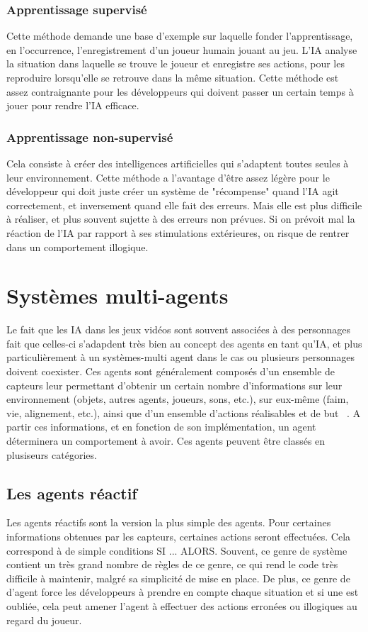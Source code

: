 \documentclass[asi]{picINSA}
\begin{document}
\subsection{Apprentissage supervisé}
Cette méthode demande une base d’exemple sur laquelle fonder l’apprentissage, en l’occurrence, l’enregistrement d’un joueur humain jouant au jeu. L’IA analyse la situation dans laquelle se trouve le joueur et enregistre ses actions, pour les reproduire lorsqu’elle se retrouve dans la même situation. Cette méthode est assez contraignante pour les développeurs qui doivent passer un certain temps à jouer pour rendre l’IA efficace.
\subsection{Apprentissage non-supervisé}
Cela consiste à créer des intelligences artificielles qui s’adaptent toutes seules à leur environnement. Cette méthode a l’avantage d’être assez légère pour le développeur qui doit juste créer un système de "récompense" quand l’IA agit correctement, et inversement  quand elle fait des erreurs. Mais elle est plus difficile à réaliser, et plus souvent sujette à des erreurs non prévues. Si on prévoit mal la réaction de l’IA par rapport à ses stimulations extérieures, on risque de rentrer dans un comportement illogique.

  
\chapter{Systèmes multi-agents}
Le fait que les IA dans les jeux vidéos sont souvent associées à des personnages fait que celles-ci s'adapdent très bien au concept des agents en tant qu'IA, et plus particulièrement à un systèmes-multi agent dans le cas ou plusieurs personnages doivent coexister.
Ces agents sont généralement composés d'un ensemble de capteurs leur permettant d'obtenir un certain nombre d'informations sur leur environnement (objets, autres agents, joueurs, sons, etc.), sur eux-même (faim, vie, alignement, etc.), ainsi que d'un ensemble d'actions réalisables et de but ~\cite{IntelAgents4CompGames}. A partir ces informations, et en fonction de son implémentation, un agent déterminera un comportement à avoir.
Ces agents peuvent être classés en plusiseurs catégories.

\section{Les agents réactif}
Les agents réactifs sont la version la plus simple des agents. Pour certaines informations obtenues par les capteurs, certaines actions seront effectuées. Cela correspond à de simple conditions SI ... ALORS. Souvent, ce genre de système contient un très grand nombre de règles de ce genre, ce qui rend le code très difficile à maintenir, malgré sa simplicité de mise en place. De plus, ce genre de d'agent force les développeurs à prendre en compte chaque situation et si une est oubliée, cela peut amener l'agent à effectuer des actions erronées ou illogiques au regard du joueur.
\end{document}
